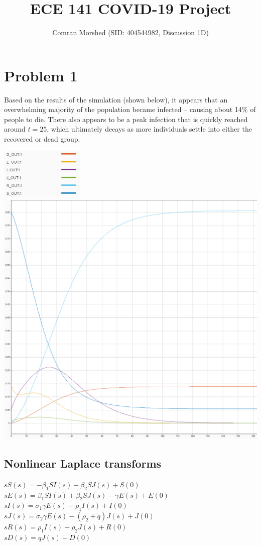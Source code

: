 \documentclass[fleqn]{article}
\begin{document}
\title{ECE 141 COVID-19 Project}
\author{Comran Morshed (SID: 404544982, Discussion 1D)}
\date{}
\maketitle

\section*{Problem 1}
Based on the results of the simulation (shown below), it appears that an overwhelming majority of the population became infected -- causing about 14\% of people to die. There also appears to be a peak infection that is quickly reached around $t=25$, which ultimately decays as more individuals settle into either the recovered or dead group.

\begin{center}
    \includegraphics[width=4cm]{outbreak_legend} \\
    \includegraphics[width=0.85\linewidth]{outbreak_graph}
\end{center}

\newpage

\subsection*{Nonlinear Laplace transforms}
$sS(s) = -\beta_1 S I(s) - \beta_2 S J(s) + S(0)$ \\
$sE(s) = \beta_1 S I(s) + \beta_2 S J(s) - \gamma E(s) + E(0)$ \\
$sI(s) = \sigma_1 \gamma E(s) - \rho_1 I(s) + I(0)$ \\
$sJ(s) = \sigma_2 \gamma E(s) - (\rho_2 + q) J(s) + J(0)$ \\
$sR(s) = \rho_1 I(s) + \rho_2 J(s) + R(0)$ \\
$sD(s) = qJ(s) + D(0)$ \\
\end{document}
